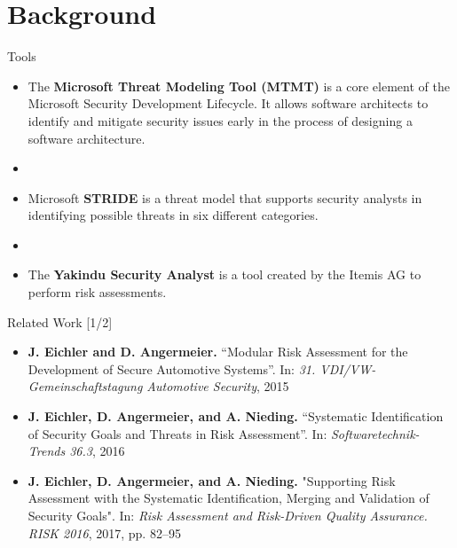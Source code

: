 \documentclass[xcolor=table]{beamer}
\begin{document}
\section{Background}

\begin{frame}{Tools}
\begin{itemize}[label={}]
    \item The \textbf{Microsoft Threat Modeling Tool (MTMT)} is a core element of the Microsoft Security Development Lifecycle. It allows software architects to identify and mitigate security issues early in the process of designing a software architecture.
    \item
    \item Microsoft \textbf{STRIDE} is a threat model that supports security analysts in identifying possible threats in six different categories.
    \item
    \item The \textbf{Yakindu Security Analyst} is a tool created by the Itemis AG to perform risk assessments.
\end{itemize}
\end{frame}


\begin{frame}{Related Work [1/2]}
\begin{itemize}
    \item \textbf{J. Eichler and D. Angermeier.} “Modular Risk Assessment for the Development of Secure Automotive Systems”. In: \textit{31. VDI/VW-Gemeinschaftstagung Automotive Security}, 2015 \cite{mora}
    \item \textbf{J. Eichler, D. Angermeier, and A. Nieding.} “Systematic Identification of Security Goals and Threats in Risk Assessment”. In: \textit{Softwaretechnik-Trends 36.3}, 2016 \cite{morasecgoals}
    \item \textbf{J. Eichler, D. Angermeier, and A. Nieding.} "Supporting Risk Assessment with the Systematic Identification, Merging and Validation of Security Goals". In: \textit{Risk Assessment and Risk-Driven Quality Assurance. RISK 2016}, 2017, pp. 82–95 \cite{angermeier2016systematic}
\end{itemize}
\end{frame}
\end{document}
